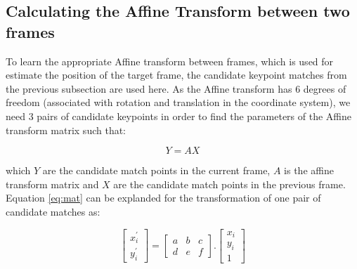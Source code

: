 \documentclass[]{IEEEtran}
\begin{document}

\subsection{Calculating the Affine Transform between two frames}

To learn the appropriate Affine transform between frames, which is used for estimate the position of the target frame, the candidate keypoint matches from the previous subsection are used here. As the Affine transform has 6 degrees of freedom (associated with rotation and translation in the coordinate system), we need 3 pairs of candidate keypoints in order to find the parameters of the Affine transform matrix such that:

\begin{equation}
    Y = AX
    \label{eq:mat}
\end{equation}

which $Y$ are the candidate match points in the current frame, $A$ is the affine transform matrix and $X$ are the candidate match points in the previous frame. 
Equation \ref{eq:mat} can be explanded for the transformation of one pair of candidate matches as:

\begin{equation}
\begin{bmatrix}
  x_{i}^{'} \\ y_{i}^{'}
\end{bmatrix}  =
\begin{bmatrix}
  a & b & c \\ d & e & f
\end{bmatrix}.
\begin{bmatrix}
  x_{i} \\ y_{i} \\ 1
\end{bmatrix}  
\end{equation}
\end{document}
